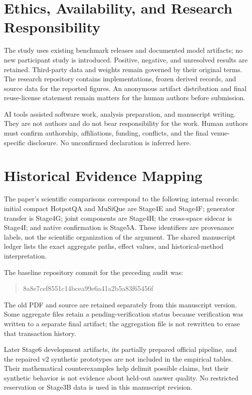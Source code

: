 \documentclass[11pt,a4paper]{article}
\begin{document}
\section*{Ethics, Availability, and Research Responsibility}
The study uses existing benchmark releases and documented model artifacts;
no new participant study is introduced. Positive, negative, and unresolved
results are retained. Third-party data and weights remain governed by their
original terms. The research repository contains implementations, frozen
derived records, and source data for the reported figures. An anonymous
artifact distribution and final reuse-license statement remain matters for
the human authors before submission.

AI tools assisted software work, analysis preparation, and manuscript
writing. They are not authors and do not bear responsibility for the work.
Human authors must confirm authorship, affiliations, funding, conflicts,
and the final venue-specific disclosure. No unconfirmed declaration is
inferred here.



\appendix
\section{Historical Evidence Mapping}
The paper's scientific comparisons correspond to the following internal
records: initial compact HotpotQA and MuSiQue are Stage4E and Stage4F;
generator transfer is Stage4G; joint components are Stage4H; the cross-space
sidecar is Stage4I; and native confirmation is Stage5A. These identifiers
are provenance labels, not the scientific organization of the argument.
The shared manuscript ledger lists the exact aggregate paths, effect
values, and historical-method interpretation.

\begin{samepage}
The baseline repository commit for the preceding audit was:
\begin{quote}\small\ttfamily
8a8e7cef8551c14bcea99e6a41a2b5a83f65456f
\end{quote}
\end{samepage}
The old PDF and source are retained separately from this manuscript version.
Some aggregate files retain a pending-verification status because verification
was written to a separate final artifact; the aggregation file is not
rewritten to erase that transaction history.

Later Stage6 development artifacts, its partially prepared official pipeline,
and the repaired v2 synthetic prototypes are not included in the empirical
tables. Their mathematical counterexamples help delimit possible claims,
but their synthetic behavior is not evidence about held-out answer quality.
No restricted reservation or Stage3B data is used in this manuscript revision.
\end{document}
